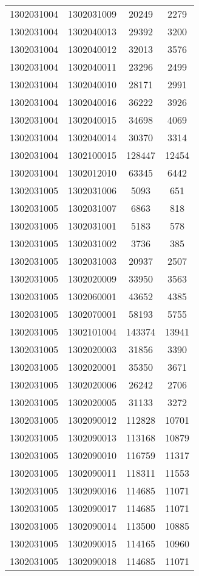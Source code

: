 \begin{longtable}[h]{llcc}
		1302031004 & 1302031009 & 20249 & 2279\\
		1302031004 & 1302040013 & 29392 & 3200\\
		1302031004 & 1302040012 & 32013 & 3576\\
		1302031004 & 1302040011 & 23296 & 2499\\
		1302031004 & 1302040010 & 28171 & 2991\\
		1302031004 & 1302040016 & 36222 & 3926\\
		1302031004 & 1302040015 & 34698 & 4069\\
		1302031004 & 1302040014 & 30370 & 3314\\
		1302031004 & 1302100015 & 128447 & 12454\\
		1302031004 & 1302012010 & 63345 & 6442\\
		1302031005 & 1302031006 & 5093 & 651\\
		1302031005 & 1302031007 & 6863 & 818\\
		1302031005 & 1302031001 & 5183 & 578\\
		1302031005 & 1302031002 & 3736 & 385\\
		1302031005 & 1302031003 & 20937 & 2507\\
		1302031005 & 1302020009 & 33950 & 3563\\
		1302031005 & 1302060001 & 43652 & 4385\\
		1302031005 & 1302070001 & 58193 & 5755\\
		1302031005 & 1302101004 & 143374 & 13941\\
		1302031005 & 1302020003 & 31856 & 3390\\
		1302031005 & 1302020001 & 35350 & 3671\\
		1302031005 & 1302020006 & 26242 & 2706\\
		1302031005 & 1302020005 & 31133 & 3272\\
		1302031005 & 1302090012 & 112828 & 10701\\
		1302031005 & 1302090013 & 113168 & 10879\\
		1302031005 & 1302090010 & 116759 & 11317\\
		1302031005 & 1302090011 & 118311 & 11553\\
		1302031005 & 1302090016 & 114685 & 11071\\
		1302031005 & 1302090017 & 114685 & 11071\\
		1302031005 & 1302090014 & 113500 & 10885\\
		1302031005 & 1302090015 & 114165 & 10960\\
		1302031005 & 1302090018 & 114685 & 11071\\

\end{longtable}
